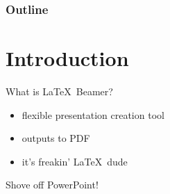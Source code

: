 \newcommand{\cmdverb}[1]{\texttt{\textbackslash #1}}

\maketitle

\begin{frame}\frametitle{Outline}
\tableofcontents[pausesections]
\end{frame}

\section{Introduction}

\begin{frame}{What is \LaTeX\ Beamer?}
\begin{itemize}
    \item flexible presentation creation tool
    \item outputs to PDF
    \item it's freakin' \LaTeX\ dude
\end{itemize}
\pause Shove off PowerPoint!
\end{frame}
